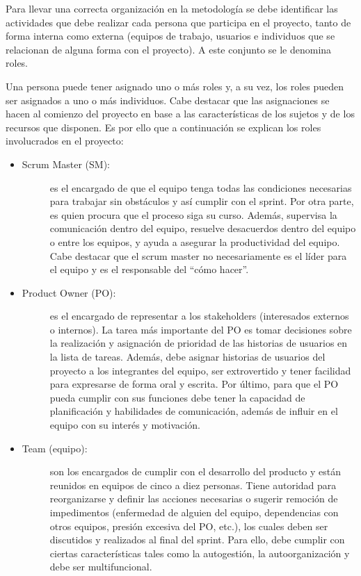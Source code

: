 Para llevar una correcta organización en la metodología se debe identificar las actividades que debe realizar cada persona que participa en el proyecto, tanto de forma interna como externa (equipos de trabajo, usuarios e individuos que se relacionan de alguna forma con el proyecto). A este conjunto se le denomina roles.

Una persona puede tener asignado uno o más roles y, a su vez, los roles pueden ser asignados a uno o más individuos. Cabe destacar que las asignaciones se hacen al comienzo del proyecto en base a las características de los sujetos y de los recursos que disponen. Es por ello que a continuación se explican los roles involucrados en el proyecto:

\begin{itemize}
    \item   \begin{description}
                \item[Scrum Master (SM):] es el encargado de que el equipo tenga todas las condiciones necesarias para trabajar sin obstáculos y así cumplir con el sprint. Por otra parte, es quien procura que el proceso siga su curso. Además, supervisa la comunicación dentro del equipo, resuelve desacuerdos dentro del equipo o entre los equipos, y ayuda a asegurar la productividad del equipo. Cabe destacar que el scrum master no necesariamente es el líder para el equipo y es el responsable del ``cómo hacer''.
            \end{description}    
    
    \item   \begin{description}
                \item[Product Owner (PO):] es el encargado de representar a los stakeholders (interesados externos o internos). La tarea más importante del PO es tomar decisiones sobre la realización y asignación de prioridad de las historias de usuarios en la lista de tareas. Además, debe asignar historias de usuarios del proyecto a los integrantes del equipo, ser extrovertido y tener facilidad para expresarse de forma oral y escrita. Por último, para que el PO pueda cumplir con sus funciones debe tener la capacidad de planificación y habilidades de comunicación, además de influir en el equipo con su interés y motivación.
            \end{description} 
    
    \item   \begin{description}
                \item[Team (equipo):] son los encargados de cumplir con el desarrollo del producto y están reunidos en equipos de cinco a diez personas. Tiene autoridad para reorganizarse y definir las acciones necesarias o sugerir remoción de impedimentos (enfermedad de alguien del equipo, dependencias con otros equipos, presión excesiva del PO, etc.), los cuales deben ser discutidos y realizados al final del sprint. Para ello, debe cumplir con ciertas características tales como la autogestión, la autoorganización y debe ser multifuncional.
            \end{description} 
    

\end{itemize}
